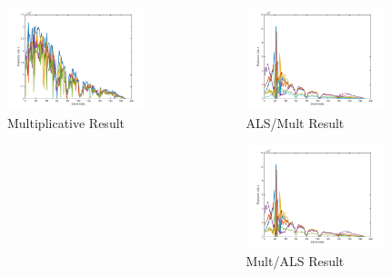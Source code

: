 \documentclass{beamer}
\begin{document}
\begin{frame}
\begin{columns}
\begin{column}{0.33\textwidth}
        \includegraphics[width=4cm,center]{recon_mult}
        \\ Multiplicative Result
        \centering
    \end{column}
    \begin{column}{0.33\textwidth}
        \includegraphics[width=4cm,center]{recon_mult_init_als}
        \\ ALS/Mult Result
        \centering

        \includegraphics[width=4cm,center]{recon_asl_init_mult}
        \\ Mult/ALS Result
        \centering
    \end{column}
\end{columns}
\end{frame}
\end{document}
